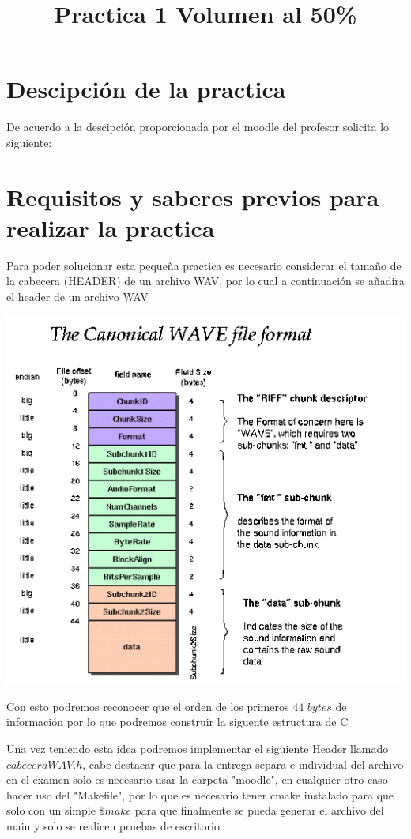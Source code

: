 \documentclass[10pt,executivepaper]{article}
\title{Practica 1 Volumen al 50\%}
\begin{document}
  \maketitle
  \section{Descipción de la practica}
  De acuerdo a la descipción proporcionada por el moodle del profesor solicita lo siguiente:
  \begin{center}
    
  \end{center}
  \clearpage
  \section{Requisitos y saberes previos para realizar la practica}
  Para poder solucionar esta pequeña practica es necesario considerar el tamaño de la cabecera (HEADER) de un archivo WAV, por lo cual a continuación se añadira el header de un archivo WAV
  \begin{center}
    \includegraphics[scale=0.75]{imgs/wavHeader.png}
  \end{center}
  Con esto podremos reconocer que el orden de los primeros $44$ $bytes$ de información por lo que podremos construir la siguente estructura de C
  \begin{center}
    
  \end{center}
  Una vez teniendo esta idea podremos implementar el siguiente Header llamado $cabeceraWAV.h$, cabe destacar que para la entrega separa e individual del archivo en el examen solo es necesario usar la carpeta "moodle", en cualquier otro caso hacer uso del "Makefile", por lo que es necesario tener cmake instalado para que solo con un simple $\$make$ para que finalmente se pueda generar el archivo del main y solo se realicen pruebas de escritorio.
\end{document}
